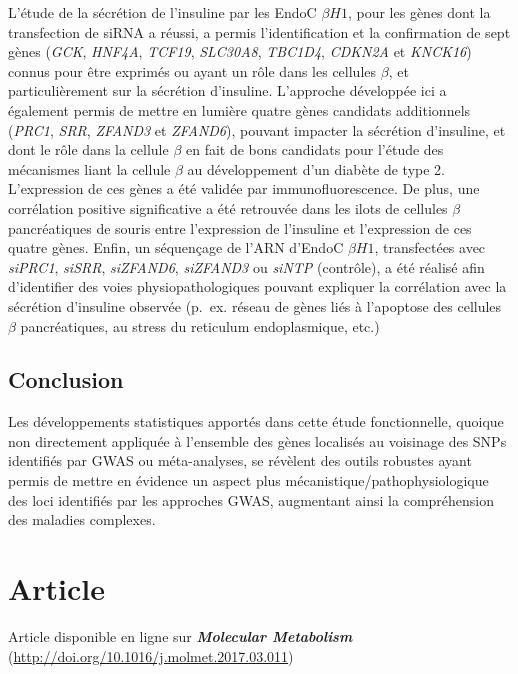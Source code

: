 \documentclass[11pt,a4paper,notrimn]{krantz}
\theoremstyle{definition}
\theoremstyle{definition}
\theoremstyle{remark}
\begin{document}
L'étude de la sécrétion de l'insuline par les EndoC \(\beta H1\), pour
les gènes dont la transfection de siRNA a réussi, a permis
l'identification et la confirmation de sept gènes (\emph{GCK},
\emph{HNF4A}, \emph{TCF19}, \emph{SLC30A8}, \emph{TBC1D4}, \emph{CDKN2A}
et \emph{KNCK16}) connus pour être exprimés ou ayant un rôle dans les
cellules \(\beta\), et particulièrement sur la sécrétion d'insuline.
L'approche développée ici a également permis de mettre en lumière quatre
gènes candidats additionnels (\emph{PRC1}, \emph{SRR}, \emph{ZFAND3} et
\emph{ZFAND6}), pouvant impacter la sécrétion d'insuline, et dont le
rôle dans la cellule \(\beta\) en fait de bons candidats pour l'étude
des mécanismes liant la cellule \(\beta\) au développement d'un diabète
de type 2. L'expression de ces gènes a été validée par
immunofluorescence. De plus, une corrélation positive significative a
été retrouvée dans les ilots de cellules \(\beta\) pancréatiques de
souris entre l'expression de l'insuline et l'expression de ces quatre
gènes. Enfin, un séquençage de l'ARN d'EndoC \(\beta H1\), transfectées
avec \emph{siPRC1}, \emph{siSRR}, \emph{siZFAND6}, \emph{siZFAND3} ou
\emph{siNTP} (contrôle), a été réalisé afin d'identifier des voies
physiopathologiques pouvant expliquer la corrélation avec la sécrétion
d'insuline observée (p.~ex. réseau de gènes liés à l'apoptose des
cellules \(\beta\) pancréatiques, au stress du reticulum endoplasmique,
etc.)

\subsection{Conclusion}\label{conclusion-1}

Les développements statistiques apportés dans cette étude fonctionnelle,
quoique non directement appliquée à l'ensemble des gènes localisés au
voisinage des SNPs identifiés par GWAS ou méta-analyses, se révèlent des
outils robustes ayant permis de mettre en évidence un aspect plus
mécanistique/pathophysiologique des loci identifiés par les approches
GWAS, augmentant ainsi la compréhension des maladies complexes.

\section{Article}\label{article-1}

Article disponible en ligne sur \textbf{\emph{Molecular Metabolism}}
(\url{http://doi.org/10.1016/j.molmet.2017.03.011}) \clearpage
\end{document}
